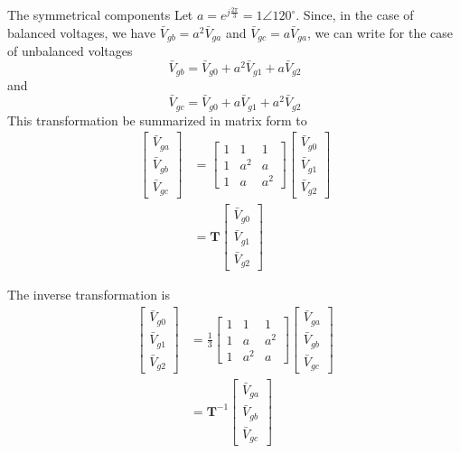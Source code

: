 \begin{frame}[allowframebreaks]{The symmetrical components}
Let $a = e^{j\frac{2\pi}{3}} = 1\angle 120^{\circ}$.
Since, in the case of balanced voltages, we have $\bar{V}_{gb} = a^2 \bar{V}_{ga}$ and $\bar{V}_{gc} = a \bar{V}_{ga}$, 
we can write for the case of unbalanced voltages 
$$\bar{V}_{gb} = \bar{V}_{g0} + a^2 \bar{V}_{g1} + a \bar{V}_{g2}$$
and 
$$\bar{V}_{gc} = \bar{V}_{g0} + a \bar{V}_{g1} + a^2 \bar{V}_{g2}$$
This transformation be summarized in matrix form to 
\begin{align}
\left[\begin{array}{l}\bar{V}_{ga} \\ \bar{V}_{gb} \\ \bar{V}_{gc}\end{array}\right]
    & =\left[
    \begin{array}{ccc}1 & 1 & 1 \\ 
    1 & a^2 & a \\ 
    1 & a & a^2
    \end{array}\right]
    \left[\begin{array}{l}\bar{V}_{g0} \\ \bar{V}_{g1} \\ \bar{V}_{g2}\end{array}\right] \\
    & = \mathbf{T} \left[\begin{array}{l}\bar{V}_{g0} \\ \bar{V}_{g1} \\ \bar{V}_{g2}\end{array}\right]
\end{align}

The inverse transformation is 
\begin{align}
\left[\begin{array}{l}\bar{V}_{g0} \\ \bar{V}_{g1} \\ \bar{V}_{g2}\end{array}\right]
    & = \frac{1}{3}\left[
    \begin{array}{ccc}1 & 1 & 1 \\ 
    1 & a & a^2 \\ 
    1 & a^2 & a
    \end{array}\right]
     \left[\begin{array}{l}\bar{V}_{ga} \\ \bar{V}_{gb} \\ \bar{V}_{gc}\end{array}\right] \\
    & = \mathbf{T}^{-1} \left[\begin{array}{l}\bar{V}_{ga} \\ \bar{V}_{gb} \\ \bar{V}_{gc}\end{array}\right]
\end{align}
\end{frame}


